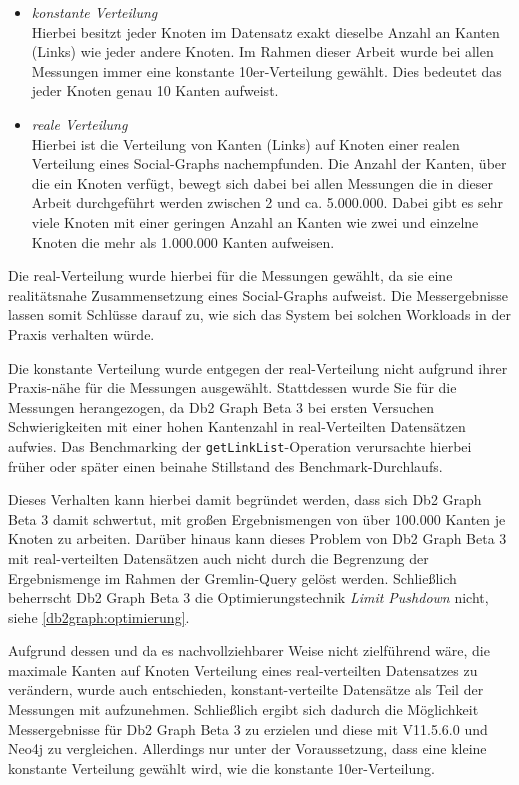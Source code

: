 \begin{itemize}
    \item \textit{konstante Verteilung}\\
    Hierbei besitzt jeder Knoten im Datensatz exakt dieselbe Anzahl an Kanten (Links) wie jeder andere Knoten. Im Rahmen dieser Arbeit wurde bei allen Messungen immer eine konstante 10er-Verteilung gewählt. Dies bedeutet das jeder Knoten genau 10 Kanten aufweist.  
    \item \textit{reale Verteilung}\\
    Hierbei ist die Verteilung von Kanten (Links) auf Knoten einer realen Verteilung eines Social-Graphs nachempfunden. Die Anzahl der Kanten, über die ein Knoten verfügt, bewegt sich dabei bei allen Messungen die in dieser Arbeit durchgeführt werden zwischen 2 und ca. 5.000.000. Dabei gibt es sehr viele Knoten mit einer geringen Anzahl an Kanten wie zwei und einzelne Knoten die mehr als 1.000.000 Kanten aufweisen. 
\end{itemize}

Die real-Verteilung wurde hierbei für die Messungen gewählt, da sie eine realitätsnahe Zusammensetzung eines Social-Graphs aufweist. Die Messergebnisse lassen somit Schlüsse darauf zu, wie sich das System bei solchen Workloads in der Praxis verhalten würde.

Die konstante Verteilung wurde entgegen der real-Verteilung nicht aufgrund ihrer Praxis-nähe für die Messungen ausgewählt. Stattdessen wurde Sie für die Messungen herangezogen, da Db2 Graph Beta 3 bei ersten Versuchen Schwierigkeiten mit einer hohen Kantenzahl in real-Verteilten Datensätzen aufwies. Das Benchmarking der \texttt{getLinkList}-Operation verursachte hierbei früher oder später einen beinahe Stillstand des Benchmark-Durchlaufs. 

Dieses Verhalten kann hierbei damit begründet werden, dass sich Db2 Graph Beta 3 damit schwertut, mit großen Ergebnismengen von über 100.000 Kanten je Knoten zu arbeiten. Darüber hinaus kann dieses Problem von Db2 Graph Beta 3 mit real-verteilten Datensätzen auch nicht durch die Begrenzung der Ergebnismenge im Rahmen der Gremlin-Query gelöst werden. Schließlich beherrscht Db2 Graph Beta 3 die Optimierungstechnik \textit{Limit Pushdown} nicht, siehe \autoref{db2graph:optimierung}. 

Aufgrund dessen und da es nachvollziehbarer Weise nicht zielführend wäre, die maximale Kanten auf Knoten Verteilung eines real-verteilten Datensatzes zu verändern, wurde auch entschieden, konstant-verteilte Datensätze als Teil der Messungen mit aufzunehmen. Schließlich ergibt sich dadurch die Möglichkeit Messergebnisse für Db2 Graph Beta 3 zu erzielen und diese mit V11.5.6.0 und Neo4j zu vergleichen. Allerdings nur unter der Voraussetzung, dass eine kleine konstante Verteilung gewählt wird, wie die konstante 10er-Verteilung. 

